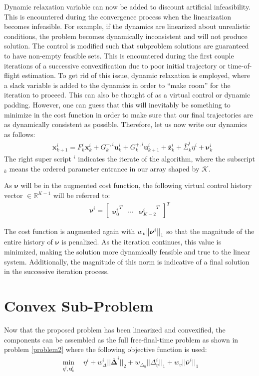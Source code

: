 Dynamic relaxation variable can now be added to discount artificial infeasibility. This is encountered during the convergence process when the linearization becomes infeasible. For example, if the dynamics are linearized about unrealistic conditions, the problem becomes dynamically inconsistent and will not produce solution. The control is modified such that subproblem solutions are guaranteed to have non-empty feasible sets. This is encountered during the first couple iterations of a successive convexification due to poor initial trajectory or time-of-flight estimation. To get rid of this issue, dynamic relaxation is employed, where a slack variable is added to the dynamics in order to ``make room'' for the iteration to proceed. This can also be thought of as a virtual control or dynamic padding. However, one can guess that this will inevitably be something to minimize in the cost function in order to make sure that our final trajectories are as dynamically consistent as possible. Therefore, let us now write our dynamics as follows: 
%
\begin{align}
& \mathbf{x}_{k+1}^i = F_k^i\mathbf{x}_k^i + G^{-,i}_k\mathbf{u}_k^i + G_k^{+,i}\mathbf{u}_{k+1}^i + \bar{\mathbf{z}}^i_k +\bar{\Sigma}_k^i\eta^i + \bm{\nu}_k^i
\end{align}
The right super script $^i$ indicates the iterate of the algorithm, where the subscript $_k$ means the ordered parameter entrance in our array shaped by $\mathcal{K}$.

As $\bm{\nu}$ will be in the augmented cost function, the following virtual control history vector $\in \mathbb{R}^{K-1}$ will be referred to:
\begin{align}
\bm{\nu}^i = 
	\begin{bmatrix}
	{\bm{\nu}_0^i}^T & \cdots & {\bm{\nu}^i_{K-2}}^T 
	\end{bmatrix}^T
\end{align}

The cost function is augmented again with $w_v \norm{\bm{\nu}^i}_1$ so that the magnitude of the entire history of $\bm{\nu}$ is penalized. As the iteration continues, this value is minimized, making the solution more dynamically feasible and true to the linear system. Additionally, the magnitude of this norm is indicative of a final solution in the successive iteration process.

\section{Convex Sub-Problem}
Now that the proposed problem has been linearized and convexified, the components can be assembled as the full free-final-time problem as shown in problem \ref{problem2} where the following objective function is used:
\begin{align}
	\min_{\eta^i, \mathbf{u}_k^i} \quad \eta^i + w_\Delta^i || \bm{\bar{\Delta}}^i ||_2 + w_{\Delta_\eta} || \Delta_\eta^i ||_1 + w_v || \bar{\bm{\nu}}^i ||_1
\end{align}

